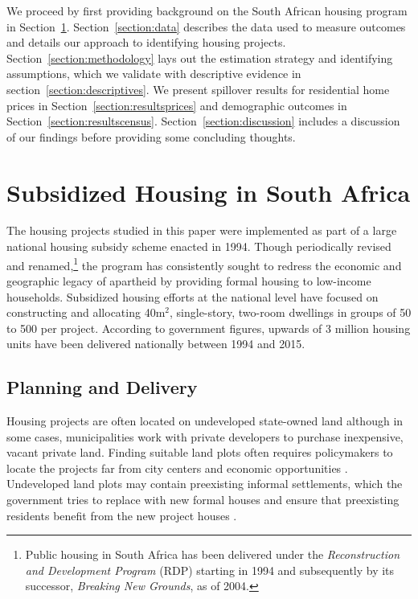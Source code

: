 \documentclass[12pt]{article}
\begin{document}
We proceed by first providing background on the South African housing program in Section~\ref{section:background}. 
Section~\ref{section:data} describes the data used to measure outcomes and details our approach to identifying housing projects. Section~\ref{section:methodology} lays out the estimation strategy and identifying assumptions, which we validate with descriptive evidence in section~\ref{section:descriptives}. We present spillover results for residential home prices in Section~\ref{section:resultsprices} and demographic outcomes in Section~\ref{section:resultscensus}.  Section~\ref{section:discussion} includes a discussion of our findings before providing some concluding thoughts.


\section{Subsidized Housing in South Africa} \label{section:background}

The housing projects studied in this paper were implemented as part of a large national housing subsidy scheme enacted in 1994. Though periodically revised and renamed,\footnote{Public housing in South Africa has been delivered under the {\it Reconstruction and Development Program} (RDP) starting in 1994 and subsequently by its successor, {\it Breaking New Grounds}, as of 2004.} the program has consistently sought to redress the economic and geographic legacy of apartheid by providing formal housing to low-income households. Subsidized housing efforts at the national level have focused on constructing and allocating 40m$^2$, single-story, two-room dwellings in groups of 50 to 500 per project. According to government figures, upwards of 3 million housing units have been delivered nationally between 1994 and 2015.

\subsection{Planning and Delivery}

Housing projects are often located on undeveloped state-owned land although in some cases, municipalities work with private developers to purchase inexpensive, vacant private land.  Finding suitable land plots often requires policymakers to locate the projects far from city centers and economic opportunities \citep{dhsreports}.  Undeveloped land plots may contain preexisting informal settlements, which the government tries to replace with new formal houses and ensure that preexisting residents benefit from the new project houses \citep{serihistory}.
\end{document}
